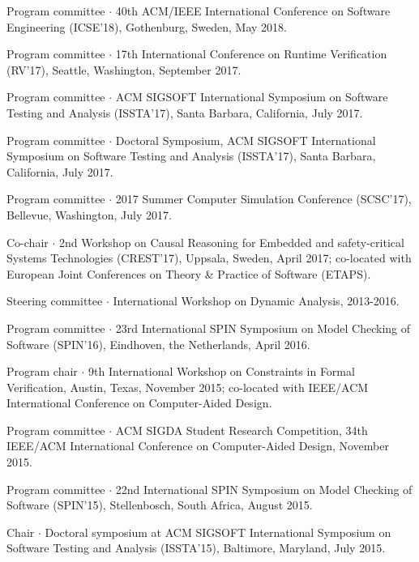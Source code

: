 \documentclass[ComputerScience]{vita}
\begin{document}
\begin{vita}
\begin{Panel and Committee Service}
\item Program committee $\cdot$ 40th ACM/IEEE International Conference on Software Engineering (ICSE'18), Gothenburg, Sweden, May 2018. 
\item Program committee $\cdot$ 17th International Conference on Runtime Verification (RV'17), Seattle, Washington, September 2017.
\item Program committee $\cdot$ ACM SIGSOFT International Symposium on Software Testing and Analysis (ISSTA'17), Santa Barbara, California, July 2017.
\item Program committee $\cdot$ Doctoral Symposium, ACM SIGSOFT International Symposium on Software Testing and Analysis (ISSTA'17), Santa Barbara, California, July 2017.
\item Program committee $\cdot$ 2017 Summer Computer Simulation Conference (SCSC'17), Bellevue, Washington, July 2017.
\item Co-chair $\cdot$  2nd Workshop on Causal Reasoning for Embedded
  and safety-critical Systems Technologies (CREST'17), Uppsala,
  Sweden, April 2017; co-located with European Joint Conferences on
  Theory \& Practice of Software (ETAPS).
\item Steering committee $\cdot$ International Workshop on Dynamic Analysis, 2013-2016.
\item Program committee $\cdot$ 23rd International SPIN Symposium on Model Checking of Software (SPIN'16), Eindhoven, the Netherlands, April 2016.
\item Program chair $\cdot$ 9th International Workshop on Constraints in Formal Verification, Austin, Texas, November 2015; co-located with IEEE/ACM International Conference on Computer-Aided Design.
\item Program committee $\cdot$ ACM SIGDA Student Research Competition, 34th IEEE/ACM International Conference on Computer-Aided Design, November 2015.
\item Program committee $\cdot$ 22nd International SPIN Symposium on Model Checking of Software (SPIN'15), Stellenbosch, South Africa, August 2015.
\item Chair $\cdot$ Doctoral symposium at ACM SIGSOFT International Symposium on Software Testing and Analysis (ISSTA'15), Baltimore, Maryland, July 2015. 

\end{Panel and Committee Service}
\end{vita}
\end{document}
